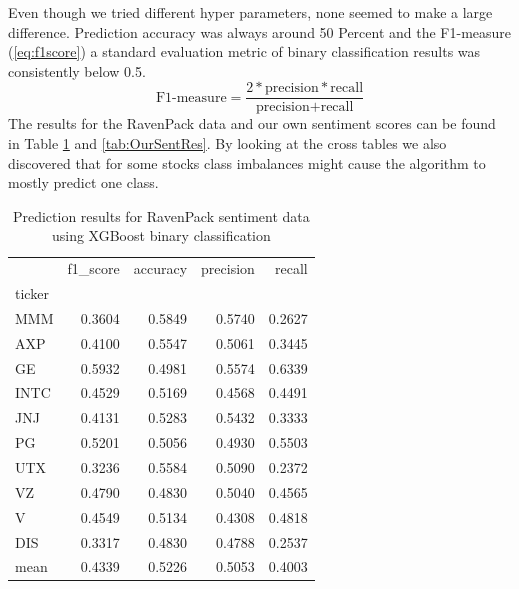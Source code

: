 Even though we tried different hyper parameters, none seemed to make a large difference. Prediction accuracy was always around 50 Percent and the F1-measure (\ref{eq:f1score}) a standard evaluation metric of binary classification results \citep{HADDI201326} was consistently below 0.5.
\begin{equation} 
    \text{F1-measure} = \frac{2*\text{precision} * \text{recall}}{\text{precision} + \text{recall}}
\end{equation}\label{eq:f1score}
The results for the RavenPack data and our own sentiment scores can be found in Table \ref{tab:RavSentRes} and \ref{tab:OurSentRes}. By looking at the cross tables we also discovered that for some stocks class imbalances might cause the algorithm to mostly predict one class. 
\begin{table}[h]
\centering
\begin{tabular}{lrrrr}
\toprule
{} &  f1\_score &  accuracy &  precision &    recall \\
ticker &           &           &            &           \\
\midrule
MMM    &  0.3604 &  0.5849 &   0.5740 &  0.2627 \\
AXP    &  0.4100 &  0.5547 &   0.5061 &  0.3445 \\
GE     &  0.5932 &  0.4981 &   0.5574 &  0.6339 \\
INTC   &  0.4529 &  0.5169 &   0.4568 &  0.4491 \\
JNJ    &  0.4131 &  0.5283 &   0.5432 &  0.3333 \\
PG     &  0.5201 &  0.5056 &   0.4930 &  0.5503 \\
UTX    &  0.3236 &  0.5584 &   0.5090 &  0.2372 \\
VZ     &  0.4790 &  0.4830 &   0.5040 &  0.4565 \\
V      &  0.4549 &  0.5134 &   0.4308 &  0.4818 \\
DIS    &  0.3317 &  0.4830 &   0.4788 &  0.2537 \\
\midrule
mean & 0.4339 & 0.5226 & 0.5053 & 0.4003 \\
\bottomrule
\end{tabular}
    \caption{Prediction results for RavenPack sentiment data using XGBoost binary classification}
    \label{tab:RavSentRes}
\end{table}
%

